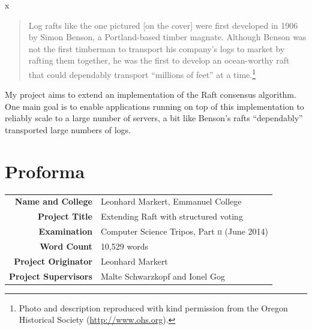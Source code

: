 \documentclass[12pt,chapterprefix=true,toc=bibliography,numbers=noendperiod,
               footnotes=multiple,twoside]{scrreprt}
\begin{document}



\begin{titlepage}


{\color{white}x}

\vfil

\begin{quote}
Log rafts like the one pictured [on the cover] were first developed in 1906 by Simon Benson, a Portland-based timber magnate. Although Benson was not the first timberman to transport his company's logs to market by rafting them together, he was the first to develop an ocean-worthy raft that could dependably transport \enquote{millions of feet} at a time.\footnote{Photo \parencite{benson} and description reproduced with kind permission from the Oregon Historical Society (\url{http://www.ohs.org}).}
\end{quote}

My project aims to extend an implementation of the Raft consensus algorithm. One main goal is to enable applications running on top of this implementation to reliably scale to a large number of servers, a bit like Benson's rafts \enquote{dependably} transported large numbers of logs.

\end{titlepage}

\chapter*{Proforma}
\label{ch:proforma}

\begin{center}
{\renewcommand{\arraystretch}{1.5}%
\begin{tabularx}{359pt}{rX}
\textbf{Name and College} & Leonhard Markert, Emmanuel College \\
\textbf{Project Title} & Extending Raft with structured voting \\
\textbf{Examination} & Computer Science Tripos, Part \textsc{ii} (June 2014) \\
\textbf{Word Count} & 10,529 words \\
\textbf{Project Originator} & Leonhard Markert \\
\textbf{Project Supervisors} & Malte Schwarzkopf and Ionel Gog
\end{tabularx}}
\end{center}
\end{document}
